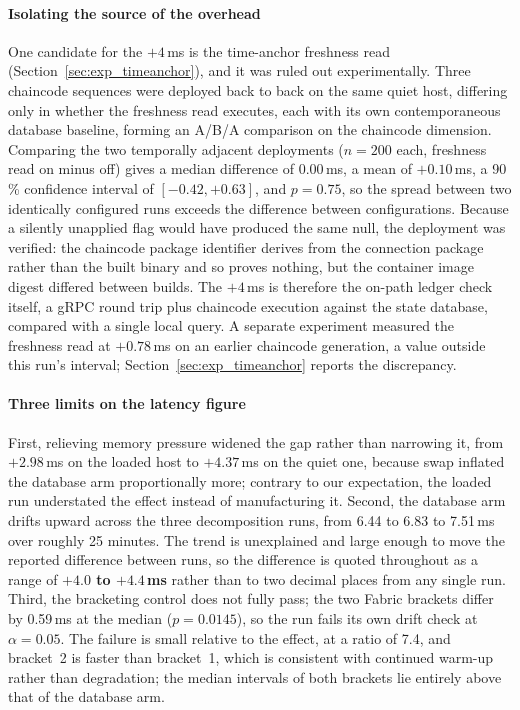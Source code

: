 \documentclass[preprint,12pt]{elsarticle}
\begin{document}
\paragraph{Isolating the source of the overhead}
One candidate for the $+4$\,ms is the time-anchor freshness read
(Section~\ref{sec:exp_timeanchor}), and it was ruled out experimentally. Three chaincode sequences were deployed back to back on the same quiet
host, differing only in whether the freshness read executes, each with its own
contemporaneous database baseline, forming an A/B/A comparison on the chaincode
dimension. Comparing the two temporally adjacent deployments ($n = 200$ each,
freshness read on minus off) gives a median difference of $0.00$\,ms, a mean
of $+0.10$\,ms, a 90\,\% confidence interval of $[-0.42, +0.63]$, and
$p = 0.75$, so the spread between
two identically configured runs exceeds the difference between configurations.
Because a silently unapplied flag would have produced the same null, the
deployment was verified: the chaincode package identifier derives from the
connection package rather than the built binary and so proves nothing, but
the container image digest differed between builds.
The $+4$\,ms is therefore the on-path ledger check itself, a gRPC round trip
plus chaincode execution against the state database, compared with a single
local query. A separate experiment measured the freshness read at $+0.78$\,ms
on an earlier chaincode generation, a value outside this run's interval;
Section~\ref{sec:exp_timeanchor} reports the discrepancy.

\paragraph{Three limits on the latency figure}
First, relieving memory pressure widened the gap rather than narrowing it,
from $+2.98$\,ms on the loaded host to $+4.37$\,ms on the quiet one, because
swap inflated the database arm proportionally more; contrary to our
expectation, the loaded run understated the effect instead of manufacturing
it. Second, the database arm drifts upward across the three decomposition
runs, from 6.44 to 6.83 to 7.51\,ms over roughly 25 minutes. The trend is
unexplained and large enough to move the reported difference between runs,
so the difference is quoted throughout as a range of \textbf{$+4.0$
to $+4.4$\,ms} rather than to two decimal places from any single run. Third,
the bracketing control does not fully pass; the two Fabric brackets differ by
0.59\,ms at the median ($p = 0.0145$), so the run fails its own drift check at
$\alpha = 0.05$. The failure is small relative to the effect, at a ratio of
7.4, and bracket~2 is faster than bracket~1, which is consistent with continued
warm-up rather than degradation; the median intervals of both brackets lie
entirely above that of the database arm.
\end{document}
